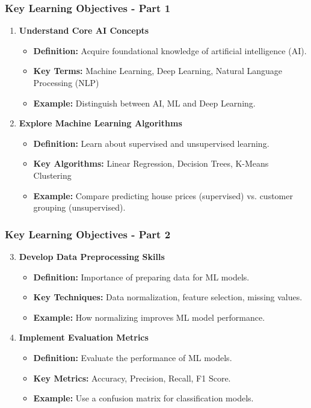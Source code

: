 \documentclass{beamer}
\begin{document}
\begin{frame}[fragile]
    \frametitle{Key Learning Objectives - Part 1}
    \begin{enumerate}
        \item \textbf{Understand Core AI Concepts}
            \begin{itemize}
                \item \textbf{Definition:} Acquire foundational knowledge of artificial intelligence (AI).
                \item \textbf{Key Terms:} Machine Learning, Deep Learning, Natural Language Processing (NLP)
                \item \textbf{Example:} Distinguish between AI, ML and Deep Learning.
            \end{itemize}
        
        \item \textbf{Explore Machine Learning Algorithms}
            \begin{itemize}
                \item \textbf{Definition:} Learn about supervised and unsupervised learning.
                \item \textbf{Key Algorithms:} Linear Regression, Decision Trees, K-Means Clustering
                \item \textbf{Example:} Compare predicting house prices (supervised) vs. customer grouping (unsupervised).
            \end{itemize}
    \end{enumerate}
\end{frame}

\begin{frame}[fragile]
    \frametitle{Key Learning Objectives - Part 2}
    \begin{enumerate}
        \setcounter{enumi}{2} %
        \item \textbf{Develop Data Preprocessing Skills}
            \begin{itemize}
                \item \textbf{Definition:} Importance of preparing data for ML models.
                \item \textbf{Key Techniques:} Data normalization, feature selection, missing values.
                \item \textbf{Example:} How normalizing improves ML model performance.
            \end{itemize}
        
        \item \textbf{Implement Evaluation Metrics}
            \begin{itemize}
                \item \textbf{Definition:} Evaluate the performance of ML models.
                \item \textbf{Key Metrics:} Accuracy, Precision, Recall, F1 Score.
                \item \textbf{Example:} Use a confusion matrix for classification models.
            \end{itemize}
    \end{enumerate}
\end{frame}
\end{document}
